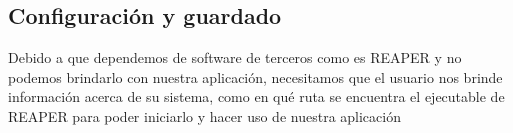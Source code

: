 \subsection{Configuración y guardado}
Debido a que dependemos de software de terceros como es REAPER y no podemos brindarlo con nuestra aplicación, necesitamos que el usuario nos brinde información acerca de su sistema, como en qué ruta se encuentra el ejecutable de REAPER para poder iniciarlo y hacer uso de nuestra aplicación
